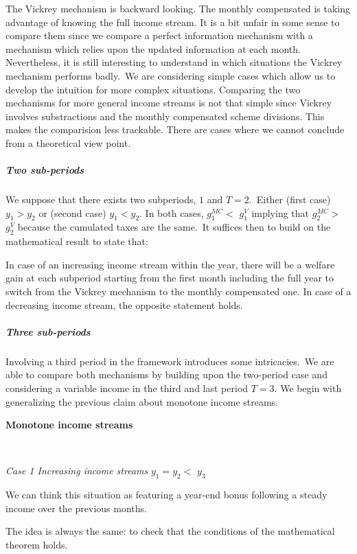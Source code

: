 The Vickrey mechanism is backward looking. The monthly compensated is taking
advantage of knowing the full income stream. It is a bit unfair in some sense
to compare them since we compare a perfect information mechanism with a
mechanism which relies upon the updated information at each month.
Nevertheless, it is still interesting to understand in which situations the
Vickrey mechanism performs badly.\ We are considering simple cases which allow
us to develop the intuition for more complex situations. Comparing the two
mechanisms for more general income streams is not that simple since Vickrey
involves substractions and the monthly compensated scheme divisions. This
makes the comparision less trackable. There are cases where we cannot conclude
from a theoretical view point. \ 

\subparagraph{Two sub-periods}

We suppose that there exists two subperiods, $1$ and $T=2$.\ Either (first
case) $y_{1}>y_{2}$ or (second case) $y_{1}<y_{2}$. In both cases, $g_{1}%
^{MC}<$ $g_{1}^{V}$ implying that $g_{2}^{MC}>$ $g_{2}^{V}$ because the
cumulated taxes are the same.\ It suffices then to build on the mathematical
result to state that:

\begin{claim}
In case of an increasing income stream within the year, there will be a
welfare gain at each subperiod starting from the first month including the
full year to switch from the Vickrey mechanism to the monthly compensated one.
In case of a decreasing income stream, the opposite statement holds.
\end{claim}

\subparagraph{Three sub-periods}

Involving a third period in the framework introduces some intricacies.\ We are
able to compare both mechanisms by building upon the two-period case and
considering a variable income in the third and last period $T=3.$ We begin
with generalizing the previous claim about monotone income streams.

\textbf{Monotone income streams}

\textbf{\ }

\textit{Case 1 Increasing income streams} $y_{1}=y_{2}<$ $y_{3}$

We can think this situation as featuring a year-end bonus following a steady
income over the previous months.

The idea is always the same: to check that the conditions of the mathematical
theorem holds.\ 

